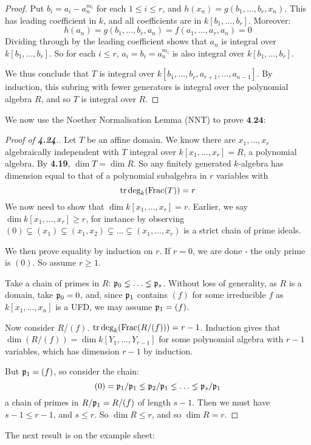 \documentclass[10pt,a4paper]{article}
\begin{document}
\begin{proof}
  Put $b_i = a_i - a_n^{m_i}$ for each $1 \leq i \leq r$, and $h(x_n)=g(b_1, \ldots, b_r, x_n)$. This has leading coefficient in $k$, and all coefficients are in $k[b_1, \ldots, b_r]$. Moreover:
  \[h(a_n) = g(b_1, \ldots, b_r, a_n) = f(a_1, \ldots, a_r, a_n) = 0\]
  Dividing through by the leading coefficient shows that $a_n$ is integral over $k[b_1, \ldots, b_r]$. So for each $i \leq r$, $a_i = b_i = a_n^{m_i}$ is also integral over $k[b_1, \ldots, b_r]$.

  We thus conclude that $T$ is integral over $k[b_1, \ldots, b_r, a_{r+1}, \ldots, a_{n-1}]$. By induction, this subring with fewer generators is integral over the polynomial algebra $R$, and so $T$ is integral over $R$.
\end{proof}
We now use the Noether Normalisation Lemma (NNT) to prove $\textbf{4.24}$:
\begin{proof}[Proof of \textbf{4.24}.]
  Let $T$ be an affine domain. We know there are $x_1, \ldots, x_r$ algebraically independent with $T$ integral over $k[x_1, \ldots, x_r] = R$, a polynomial algebra. By \textbf{4.19}, $\dim T = \dim R$. So any finitely generated $k$-algebra has dimension equal to that of a polynomial subalgebra in $r$ variables with
  \[\operatorname{tr}\deg_k(\operatorname{Frac}(T)) = r\]
  We now need to show that $\dim k[x_1, \ldots, x_r] = r$. Earlier, we say $\dim k[x_1, \ldots, x_r] \geq r$, for instance by observing $(0) \subsetneq (x_1)\subsetneq (x_1, x_2) \subsetneq \ldots \subsetneq (x_1, \ldots, x_r)$ is a strict chain of prime ideals.

  We then prove equality by induction on $r$. If $r= 0$, we are done - the only prime is $(0)$. So assume $r \geq 1$.

  Take a chain of primes in $R$: $\mathfrak{p}_0\lneq \ldots \lneq \mathfrak{p}_s$. Without loss of generality, as $R$ is a domain, take $\mathfrak{p}_0 = 0$, and, since $\mathfrak{p}_1$ contains $(f)$ for some irreducible $f$ as $k[x_1, \ldots, x_n]$ is a UFD, we may assume $\mathfrak{p}_1 = (f)$.

  Now consider $R/(f)$. $\operatorname{tr}\deg_k(\operatorname{Frac}(R/(f))) = r-1$. Induction gives that $\dim(R/(f)) = \dim k[Y_1, \ldots, Y_{r-1}]$ for some polynomial algebra with $r-1$ variables, which has dimension $r-1$ by induction.

  But $\mathfrak{p}_1 = (f)$, so consider the chain:
  \[(0) = \mathfrak{p}_1/\mathfrak{p}_1 \lneq \mathfrak{p}_2/\mathfrak{p}_1 \lneq \ldots \lneq \mathfrak{p}_s/\mathfrak{p}_1\]
  a chain of primes in $R/\mathfrak{p}_1 = R/(f)$ of length $s-1$. Then we must have $s-1 \leq r-1$, and $s \leq r$. So $\dim R \leq r$, and so $\dim R = r$.
\end{proof}
The next result is on the example sheet:
\end{document}
